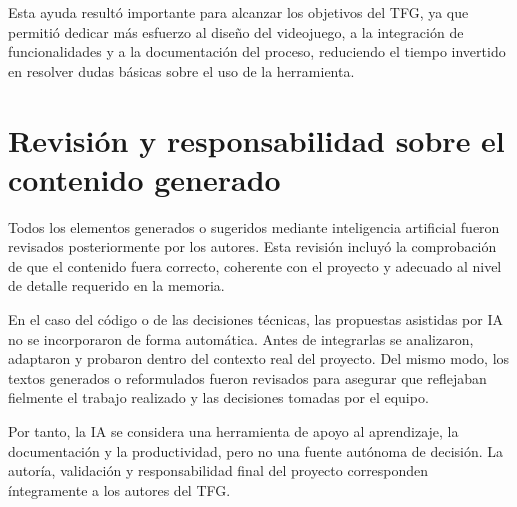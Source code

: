 Esta ayuda resultó importante para alcanzar los objetivos del TFG, ya que permitió dedicar
más esfuerzo al diseño del videojuego, a la integración de funcionalidades y a la
documentación del proceso, reduciendo el tiempo invertido en resolver dudas básicas sobre
el uso de la herramienta.

\section{Revisión y responsabilidad sobre el contenido generado}
Todos los elementos generados o sugeridos mediante inteligencia artificial fueron revisados
posteriormente por los autores. Esta revisión incluyó la comprobación de que el contenido
fuera correcto, coherente con el proyecto y adecuado al nivel de detalle requerido en la
memoria.

En el caso del código o de las decisiones técnicas, las propuestas asistidas por IA no se
incorporaron de forma automática. Antes de integrarlas se analizaron, adaptaron y probaron
dentro del contexto real del proyecto. Del mismo modo, los textos generados o reformulados
fueron revisados para asegurar que reflejaban fielmente el trabajo realizado y las
decisiones tomadas por el equipo.

Por tanto, la IA se considera una herramienta de apoyo al aprendizaje, la documentación y
la productividad, pero no una fuente autónoma de decisión. La autoría, validación y
responsabilidad final del proyecto corresponden íntegramente a los autores del TFG.
